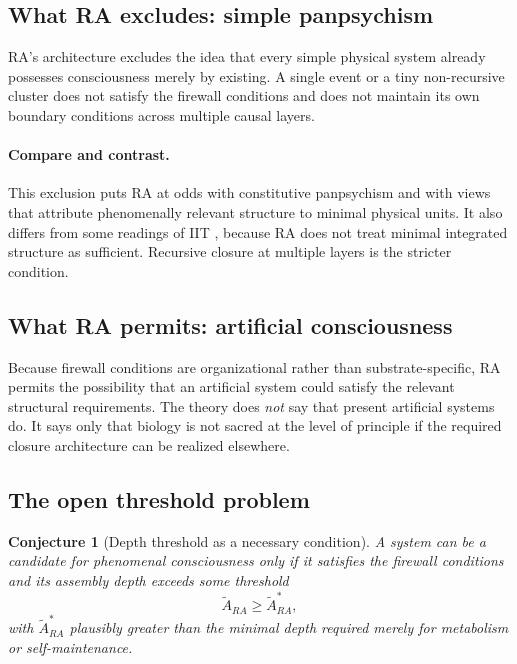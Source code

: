 \documentclass[11pt]{article}
\def\mathrm#1{#1}%
\newtheorem{conjecture}{Conjecture}
\begin{document}
\subsection{What RA excludes: simple panpsychism}

RA's architecture excludes the idea that every simple physical system already possesses consciousness merely by existing. A single event or a tiny non-recursive cluster does not satisfy the firewall conditions and does not maintain its own boundary conditions across multiple causal layers.

\paragraph{Compare and contrast.} This exclusion puts RA at odds with constitutive panpsychism and with views that attribute phenomenally relevant structure to minimal physical units. It also differs from some readings of IIT \cite{Tononi2016}, because RA does not treat minimal integrated structure as sufficient. Recursive closure at multiple layers is the stricter condition.

\subsection{What RA permits: artificial consciousness}

Because firewall conditions are organizational rather than substrate-specific, RA permits the possibility that an artificial system could satisfy the relevant structural requirements. The theory does \emph{not} say that present artificial systems do. It says only that biology is not sacred at the level of principle if the required closure architecture can be realized elsewhere.

\subsection{The open threshold problem}

\begin{conjecture}[Depth threshold as a necessary condition]
A system can be a candidate for phenomenal consciousness only if it satisfies the firewall conditions and its assembly depth exceeds some threshold
\[
\tilde{A}_{\mathrm{RA}} \ge \tilde{A}_{\mathrm{RA}}^{\ast},
\]
with $\tilde{A}_{\mathrm{RA}}^{\ast}$ plausibly greater than the minimal depth required merely for metabolism or self-maintenance.
\end{conjecture}
\end{document}
